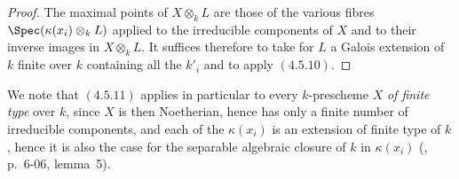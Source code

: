 \begin{proof}
The maximal points of $X\otimes_k L$ are those of the various fibres $\Spec(\kappa(x_i)\otimes_k L)$ applied to the irreducible components of $X$ and to their inverse images in $X\otimes_k L$.
It suffices therefore to take for $L$ a Galois extension of $k$ finite over $k$ containing all the $k'_i$ and to apply $(4.5.10)$.
\end{proof}

We note that $(4.5.11)$ applies in particular to every $k$-prescheme $X$ \emph{of finite type} over $k$, since $X$ is then Noetherian, hence has only a finite number of irreducible components, and each of the $\kappa(x_i)$ is an extension of finite type of $k$, hence it is also the case for the separable algebraic closure of $k$ in $\kappa(x_i)$ (\cite{I}, p.~6-06, lemma~5).

